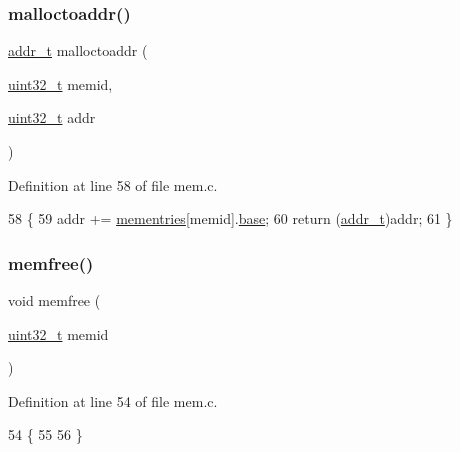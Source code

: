 \subsubsection{\texorpdfstring{malloctoaddr()}{malloctoaddr()}}
{\footnotesize\ttfamily \hyperlink{a00095_a295f71165288684c38c6bb836fbb3c59_a295f71165288684c38c6bb836fbb3c59}{addr\+\_\+t} malloctoaddr (\begin{DoxyParamCaption}\item[{\hyperlink{a00095_a435d1572bf3f880d55459d9805097f62_a435d1572bf3f880d55459d9805097f62}{uint32\+\_\+t}}]{memid,  }\item[{\hyperlink{a00095_a435d1572bf3f880d55459d9805097f62_a435d1572bf3f880d55459d9805097f62}{uint32\+\_\+t}}]{addr }\end{DoxyParamCaption})}



Definition at line 58 of file mem.\+c.


\begin{DoxyCode}
58                                                    \{
59     addr += \hyperlink{a00107_a9ec3d7a60bca9bd965aba15905c6d1ed_a9ec3d7a60bca9bd965aba15905c6d1ed}{mementries}[memid].\hyperlink{a00164_ad6175fdf80547c655c7f35cff7ff82f9_ad6175fdf80547c655c7f35cff7ff82f9}{base};
60     \textcolor{keywordflow}{return} (\hyperlink{a00095_a295f71165288684c38c6bb836fbb3c59_a295f71165288684c38c6bb836fbb3c59}{addr\_t})addr;
61 \}
\end{DoxyCode}
\mbox{\label{a00110_a54eab910cb28c3f5ff9b02bf5feaa778_a54eab910cb28c3f5ff9b02bf5feaa778}} 
\subsubsection{\texorpdfstring{memfree()}{memfree()}}
{\footnotesize\ttfamily void memfree (\begin{DoxyParamCaption}\item[{\hyperlink{a00095_a435d1572bf3f880d55459d9805097f62_a435d1572bf3f880d55459d9805097f62}{uint32\+\_\+t}}]{memid }\end{DoxyParamCaption})}



Definition at line 54 of file mem.\+c.


\begin{DoxyCode}
54                              \{
55     
56 \}
\end{DoxyCode}
\mbox{\label{a00110_a60f8bf957bca47c651dc4024dc26f36e_a60f8bf957bca47c651dc4024dc26f36e}} 
